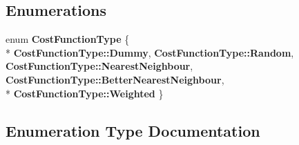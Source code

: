 \subsection*{Enumerations}
\begin{DoxyCompactItemize}
\item 
enum {\bf Cost\+Function\+Type} \{ \\*
{\bf Cost\+Function\+Type\+::\+Dummy}, 
{\bf Cost\+Function\+Type\+::\+Random}, 
{\bf Cost\+Function\+Type\+::\+Nearest\+Neighbour}, 
{\bf Cost\+Function\+Type\+::\+Better\+Nearest\+Neighbour}, 
\\*
{\bf Cost\+Function\+Type\+::\+Weighted}
 \}
\end{DoxyCompactItemize}


\subsection{Enumeration Type Documentation}
